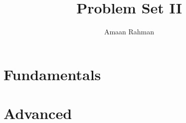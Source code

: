 \documentclass[12pt]{article}
\title{Problem Set II}
\author{Amaan Rahman}
\begin{document}
\maketitle
\section*{Fundamentals}

\section*{Advanced}

\end{document}
